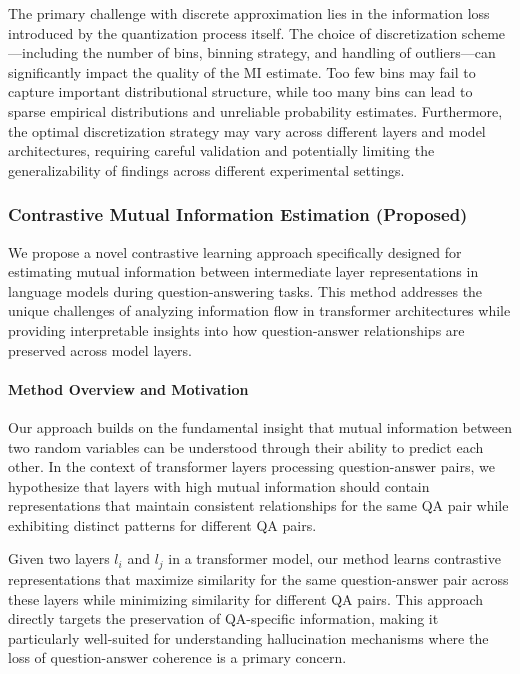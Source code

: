 The primary challenge with discrete approximation lies in the information loss introduced by the quantization process itself. The choice of discretization scheme—including the number of bins, binning strategy, and handling of outliers—can significantly impact the quality of the MI estimate. Too few bins may fail to capture important distributional structure, while too many bins can lead to sparse empirical distributions and unreliable probability estimates. Furthermore, the optimal discretization strategy may vary across different layers and model architectures, requiring careful validation and potentially limiting the generalizability of findings across different experimental settings.

\subsubsection{Contrastive Mutual Information Estimation (Proposed)}

We propose a novel contrastive learning approach specifically designed for estimating mutual information between intermediate layer representations in language models during question-answering tasks. This method addresses the unique challenges of analyzing information flow in transformer architectures while providing interpretable insights into how question-answer relationships are preserved across model layers.

\paragraph{Method Overview and Motivation}

Our approach builds on the fundamental insight that mutual information between two random variables can be understood through their ability to predict each other. In the context of transformer layers processing question-answer pairs, we hypothesize that layers with high mutual information should contain representations that maintain consistent relationships for the same QA pair while exhibiting distinct patterns for different QA pairs.

Given two layers $l_i$ and $l_j$ in a transformer model, our method learns contrastive representations that maximize similarity for the same question-answer pair across these layers while minimizing similarity for different QA pairs. This approach directly targets the preservation of QA-specific information, making it particularly well-suited for understanding hallucination mechanisms where the loss of question-answer coherence is a primary concern.

